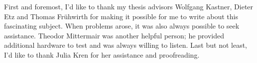 First and foremost, I'd like to thank my thesis advisors Wolfgang Kastner, Dieter Etz and Thomas Frühwirth for making it possible for me to write about this fascinating subject. When problems arose, it was also always possible to seek assistance.  Theodor Mittermair was another helpful person; he provided additional hardware to test and was always willing to listen. Last but not least, I'd like to thank Julia Kren for her assistance and proofreading.
